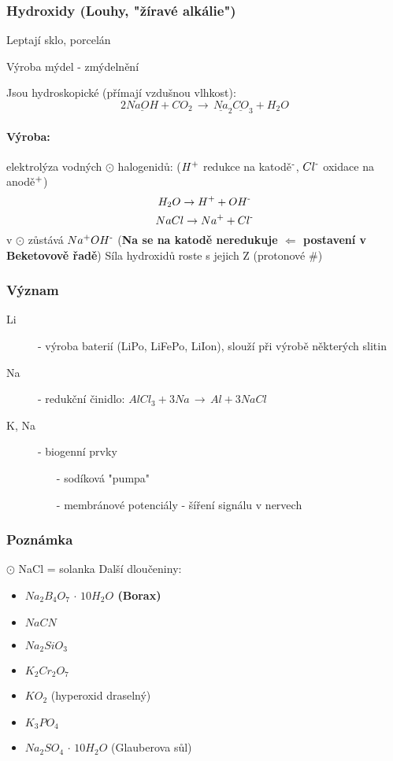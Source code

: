 \documentclass{article}
\def\SP#1{\textsuperscript{#1}}
\def\WATER{H_2O}
\begin{document}
    \newpage
    \subsubsection{Hydroxidy (Louhy, "žíravé alkálie")}
        Leptají sklo, porcelán

        Výroba mýdel - zmýdelnění

        Jsou hydroskopické (přímají vzdušnou vlhkost):\[2\underline{NaOH} + CO_2\,\to\,\underline{Na}_2\underline{CO}_3 + \WATER \]
        \paragraph*{Výroba:}
            elektrolýza vodných $\odot$ halogenidů: ($H\SP{+}$ redukce na katodě$\SP{-}$, $Cl\SP{-}$ oxidace na anodě$\SP{+}$)
            \[\WATER \to H \SP{+} + OH\SP{-}\]
            \[NaCl \to Na\SP{+} + Cl\SP{-}\]
            v $\odot$ zůstává $Na\SP{+}OH\SP{-}$ (\textbf{Na se na katodě neredukuje $\Longleftarrow $ postavení v Beketovově řadě})
            Síla hydroxidů roste s jejich Z (protonové \#)
    \subsubsection{Význam}
        \begin{description}
            \item[Li] - výroba baterií (LiPo, LiFePo, LiIon), slouží při výrobě některých slitin
            \item[Na] - redukční činidlo: \(AlCl_3 + 3Na\,\to\,Al+3NaCl\)
            \item[K, Na] - biogenní prvky \begin{itemize}
                \item[-] sodíková "pumpa"
                \item[-] membránové potenciály - šíření signálu v nervech
            \end{itemize}
        \end{description}
    \subsubsection{Poznámka}
    $\odot$ NaCl = solanka
    \newline
    \newline
    Další dloučeniny:
    \begin{itemize}
        \item \textbf{$ Na _2 B _4 O _7 \, \cdot \, 10 \WATER$ (Borax)}
        \item $NaCN$
        \item $Na_2SiO_3$
        \item $K _2 Cr _2 O _7$
        \item $K O _2$ (hyperoxid draselný)
        \item $K _3 P O _4$
        \item $Na _2 SO _4 \, \cdot \, 10 \WATER$ (Glauberova sůl)
    \end{itemize}
\end{document}
